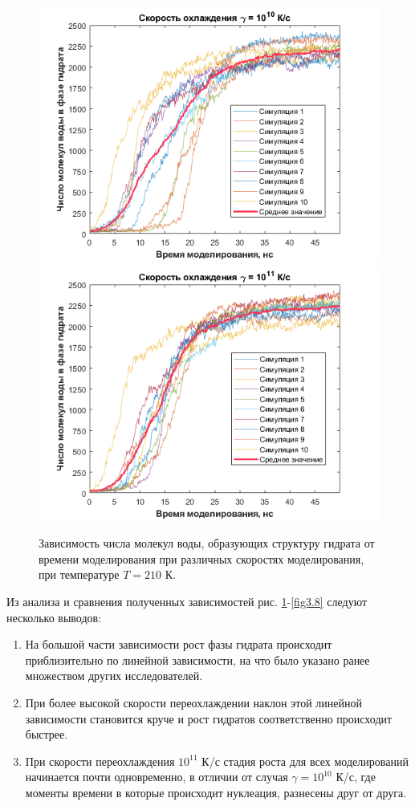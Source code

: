 \begin{figure}[H]
    \centering
    \begin{minipage}{\linewidth}
        \includegraphics[width=.49\linewidth]{figures/bulk10.png}
        \includegraphics[width=.49\linewidth]{figures/bulk11.png}
    \end{minipage}
    \caption{Зависимость числа молекул воды, образующих структуру гидрата от времени моделирования при различных скоростях моделирования, при температуре $T=210$ К.}
    \label{fig3.7}
\end{figure}

Из анализа и сравнения полученных зависимостей рис. \ref{fig3.7}-\ref{fig3.8} следуют несколько выводов:
\begin{enumerate}
    \item На большой части зависимости рост фазы гидрата происходит приблизительно по линейной зависимости, на что было указано ранее множеством других исследователей.
    \item При более высокой скорости переохлаждении наклон этой линейной зависимости становится круче и рост гидратов соответственно происходит быстрее.
    \item При скорости переохлаждения $10^{11}$ К/с стадия роста для всех моделирований начинается почти одновременно, в отличии от случая $\gamma=10^10$ К/с, где моменты времени в которые происходит нуклеация, разнесены друг от друга.
\end{enumerate}

